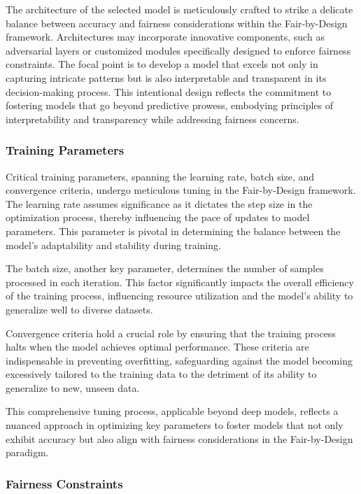 \documentclass[12pt,a4paper,openright,twoside]{book}
\begin{document}
The architecture of the selected model is meticulously crafted to strike a delicate balance between accuracy and fairness considerations within the Fair-by-Design framework. Architectures may incorporate innovative components, such as adversarial layers or customized modules specifically designed to enforce fairness constraints. The focal point is to develop a model that excels not only in capturing intricate patterns but is also interpretable and transparent in its decision-making process. This intentional design reflects the commitment to fostering models that go beyond predictive prowess, embodying principles of interpretability and transparency while addressing fairness concerns.

\subsubsection{Training Parameters}

Critical training parameters, spanning the learning rate, batch size, and convergence criteria, undergo meticulous tuning in the Fair-by-Design framework. The learning rate assumes significance as it dictates the step size in the optimization process, thereby influencing the pace of updates to model parameters. This parameter is pivotal in determining the balance between the model's adaptability and stability during training.

The batch size, another key parameter, determines the number of samples processed in each iteration. This factor significantly impacts the overall efficiency of the training process, influencing resource utilization and the model's ability to generalize well to diverse datasets.

Convergence criteria hold a crucial role by ensuring that the training process halts when the model achieves optimal performance. These criteria are indispensable in preventing overfitting, safeguarding against the model becoming excessively tailored to the training data to the detriment of its ability to generalize to new, unseen data.

This comprehensive tuning process, applicable beyond deep models, reflects a nuanced approach in optimizing key parameters to foster models that not only exhibit accuracy but also align with fairness considerations in the Fair-by-Design paradigm.

\subsubsection{Fairness Constraints}
\end{document}
